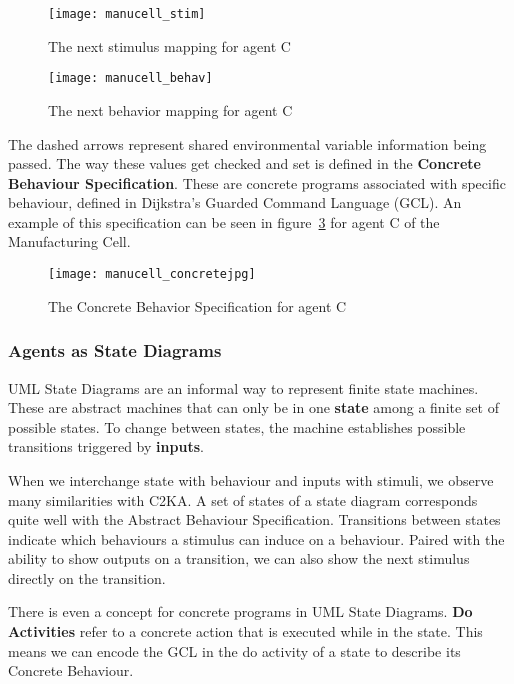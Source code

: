 \begin{figure}
    \centering
    \texttt{[image: manucell\_stim]}
    \caption{The next stimulus mapping for agent C~\cite{manu_cell}}
    \label{fig:manucell_stim}
\end{figure}
\begin{figure}
    \centering
    \texttt{[image: manucell\_behav]}
    \caption{The next behavior mapping for agent C~\cite{manu_cell}}
    \label{fig:manucell_behav}
\end{figure}

The dashed arrows represent shared environmental variable information being passed.
The way these values get checked and set is defined in the \textbf{Concrete Behaviour Specification}.
These are concrete programs associated with specific behaviour, defined in Dijkstra's Guarded Command Language (GCL).
An example of this specification can be seen in figure~\ref{fig:manu_concrete} for agent C of the Manufacturing Cell.
\begin{figure}
    \centering
    \texttt{[image: manucell\_concretejpg]}
    \caption{The Concrete Behavior Specification for agent C~\cite{manu_cell}}
    \label{fig:manu_concrete}
\end{figure}

\subsubsection{Agents as State Diagrams}\label{subsubsec:diagram-agents}
UML State Diagrams are an informal way to represent finite state machines.
These are abstract machines that can only be in one \textbf{state} among a finite set of possible states.
To change between states, the machine establishes possible transitions triggered by \textbf{inputs}.

When we interchange state with behaviour and inputs with stimuli, we observe many similarities with C2KA\@.
A set of states of a state diagram corresponds quite well with the Abstract Behaviour Specification.
Transitions between states indicate which behaviours a stimulus can induce on a behaviour.
Paired with the ability to show outputs on a transition, we can also show the next stimulus directly on the transition.

There is even a concept for concrete programs in UML State Diagrams.
\textbf{Do Activities} refer to a concrete action that is executed while in the state.
This means we can encode the GCL in the do activity of a state to describe its Concrete Behaviour.


